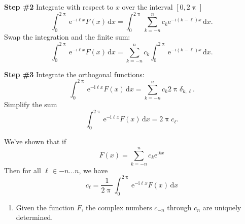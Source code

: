 \documentclass[portrait,fleqn,12pt]{beamer}
\newcommand{\euler}{\mathrm{e}}
\newcommand{\imag}{\mathrm{i}}
\newenvironment{handlist}
   {\begin{enumerate}[\faHandPointRight]
       \addtolength{\itemsep}{0.0\itemsep}}
     {\end{enumerate}}
\begin{document}
\begin{frame}
    \textbf{Step \#2} Integrate with respect to $x$ over the 
    interval $[0, 2 \uppi]$
    \begin{equation}
       \int_0^{2 \uppi} \euler^{-\imag  \ell x} F(x) \,
         \mathrm{d}x =  \int_0^{2 \uppi} \sum_{k=-n}^n c_k 
        \euler^{-\imag  (k - \ell) x} \,
        \mathrm{d}x.
 \end{equation}
 Swap the integration and the finite sum:
 \begin{equation}
       \int_0^{2 \uppi} \euler^{-\imag  \ell x} F(x) \,
         \mathrm{d}x =  \sum_{k=-n}^n c_k 
         \int_0^{2 \uppi}  \euler^{-\imag  (k - \ell) x} \,   \mathrm{d}x.
 \end{equation}
 \end{frame}
 
 \begin{frame}
   \textbf{Step \#3} Integrate the orthogonal functions:
   \begin{equation}
       \int_0^{2 \uppi} \euler^{-\imag  \ell x} F(x) \,
         \mathrm{d}x =  \sum_{k=-n}^n c_k  2 \uppi \delta_{k, \ell} .
       \end{equation}
   Simplify the sum
   \begin{equation}
       \int_0^{2 \uppi} \euler^{-\imag  \ell x} F(x) \,
         \mathrm{d}x =   2 \uppi c_\ell.
       \end{equation}
  
 \end{frame}
 
 \begin{frame}
 We've shown that if 
 \begin{equation}
    F(x) = \sum_{k=-n}^n c_k \euler^{\imag  k x}
\end{equation}
Then for all $\ell \in -n \dots n$, we have
\begin{equation}
   c_\ell = \frac{1}{2 \uppi} \int_0^{2 \uppi} \euler^{-\imag  \ell x} F(x) \, \mathrm{d}x
\end{equation}
\begin{handlist}
\item Given the function $F$, the complex numbers $c_{-n}$ through $c_n$ are uniquely determined.
\end{handlist}
 \end{frame}
 
\end{document}
